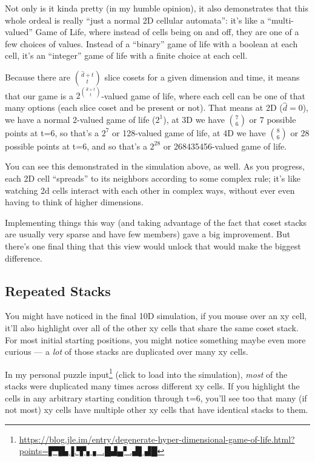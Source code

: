 \documentclass[]{article}
\renewcommand{\href}[2]{#2\footnote{\url{#1}}}
\begin{document}
Not only is it kinda pretty (in my humble opinion), it also demonstrates that
this whole ordeal is really ``just a normal 2D cellular automata'': it's like a
``multi-valued'' Game of Life, where instead of cells being on and off, they are
one of a few choices of values. Instead of a ``binary'' game of life with a
boolean at each cell, it's an ``integer'' game of life with a finite choice at
each cell.

Because there are \({ {\hat{d}}+t} \choose t\) slice cosets for a given
dimension and time, it means that our game is a
\(2^{ { \hat{d} + t} \choose t }\)-valued game of life, where each cell can be
one of that many options (each slice coset and be present or not). That means at
2D (\(\hat{d} = 0\)), we have a normal 2-valued game of life (\(2^1\)), at 3D we
have \(7 \choose 6\) or 7 possible points at t=6, so that's a \(2^7\) or
128-valued game of life, at 4D we have \(8 \choose 6\) or 28 possible points at
t=6, and so that's a \(2^{28}\) or 268435456-valued game of life.

You can see this demonstrated in the simulation above, as well. As you progress,
each 2D cell ``spreads'' to its neighbors according to some complex rule; it's
like watching 2d cells interact with each other in complex ways, without ever
even having to think of higher dimensions.

Implementing things this way (and taking advantage of the fact that coset stacks
are usually very sparse and have few members) gave a big improvement. But
there's one final thing that this view would unlock that would make the biggest
difference.

\hypertarget{repeated-stacks}{%
\subsection{Repeated Stacks}\label{repeated-stacks}}

You might have noticed in the final 10D simulation, if you mouse over an xy
cell, it'll also highlight over all of the other xy cells that share the same
coset stack. For most initial starting positions, you might notice something
maybe even more curious --- a \emph{lot} of those stacks are duplicated over
many xy cells.

In my
\href{https://blog.jle.im/entry/degenerate-hyper-dimensional-game-of-life.html?points=▛▜▙▐.▜▚▗_.█▟▄▘.▟▌▟█}{personal
puzzle input} (click to load into the simulation), \emph{most} of the stacks
were duplicated many times across different xy cells. If you highlight the cells
in any arbitrary starting condition through t=6, you'll see too that many (if
not most) xy cells have multiple other xy cells that have identical stacks to
them.
\end{document}
